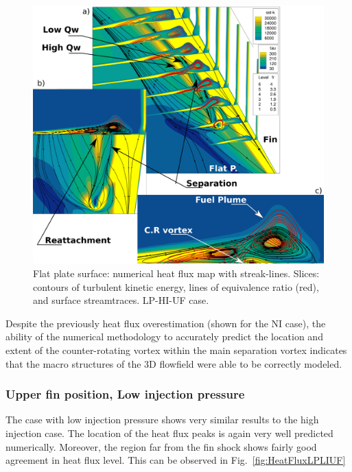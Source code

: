 \documentclass{AIAA}
\begin{document}
\begin{figure}[!h]
\center
\includegraphics[trim = 0mm 0mm 0mm 0mm, clip, width=0.95\columnwidth,valign=t]{Figures/Flowfield_Experimental_Vred.pdf}
\caption{Flat plate surface: numerical heat flux map with streak-lines. Slices: contours of turbulent kinetic energy, lines of equivalence ratio (red), and surface streamtraces. LP-HI-UF case.}
\label{fig:Exper_Flowf}
\end{figure} 


Despite the previously heat flux overestimation (shown for the NI case), the ability of the numerical methodology to accurately predict the location and extent of the counter-rotating vortex within the main separation vortex indicates that the macro structures of the 3D flowfield were able to be correctly modeled.


\subsubsection{Upper fin position, Low injection pressure}

The case with low injection pressure shows very similar results to the high injection case. 
The location of the heat flux peaks is again very well predicted numerically.
Moreover, the region far from the fin shock shows fairly good agreement in heat flux level.
This can be observed in Fig.~\ref{fig:HeatFluxLPLIUF}
\end{document}
